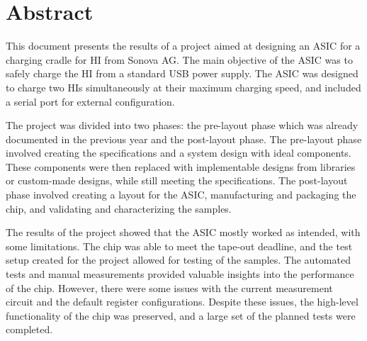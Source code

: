 \section*{\huge Abstract}
This document presents the results of a project aimed at designing an \ac{ASIC} for a charging cradle for \ac{HI} from Sonova AG. The main objective of the \ac{ASIC} was to safely charge the HI from a standard USB power supply. The \ac{ASIC} was designed to charge two HIs simultaneously at their maximum charging speed, and included a serial port for external configuration.

The project was divided into two phases: the pre-layout phase which was already documented in the previous year and the post-layout phase. The pre-layout phase involved creating the specifications and a system design with ideal components. These components were then replaced with implementable designs from libraries or custom-made designs, while still meeting the specifications. 
The post-layout phase involved creating a layout for the ASIC, manufacturing and packaging the chip, and validating and characterizing the samples.

The results of the project showed that the \ac{ASIC} mostly worked as intended, with some limitations. The chip was able to meet the tape-out deadline, and the test setup created for the project allowed for testing of the samples. The automated tests and manual measurements provided valuable insights into the performance of the chip. However, there were some issues with the current measurement circuit and the default register configurations. Despite these issues, the high-level functionality of the chip was preserved, and a large set of the planned tests were completed.



\label{chap:abstract}
\clearpage
